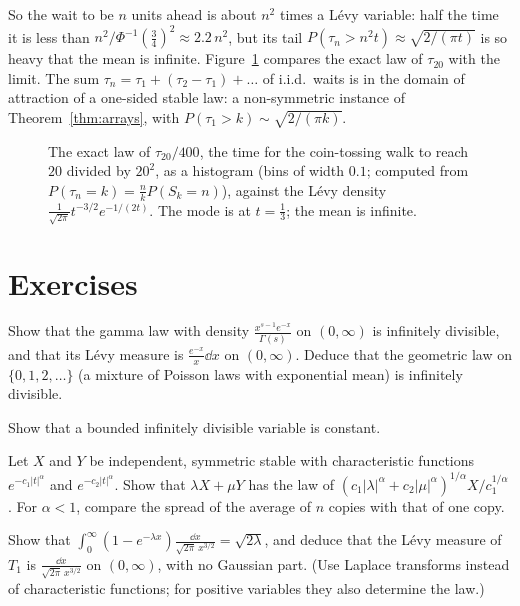 So the wait to be $n$ units ahead is about $n^2$ times a L\'evy variable: half the time it is less than $n^2/\Phi^{-1}(\frac34)^2\approx2.2\,n^2$, but its
tail $P(\tau_n>n^2t)\approx\sqrt{2/(\pi t)}$ is so heavy that the mean is infinite. Figure~\ref{fig:firstpassage} compares the exact law of $\tau_{20}$ with the limit.
The sum $\tau_n=\tau_1+(\tau_2-\tau_1)+\dots$ of i.i.d.\ waits is in the domain of attraction of a one-sided stable law: a non-symmetric instance of
Theorem~\ref{thm:arrays}, with $P(\tau_1>k)\sim\sqrt{2/(\pi k)}$.

\begin{figure}[ht]
\centering{}
\caption{The exact law of $\tau_{20}/400$, the time for the coin-tossing walk to reach $20$ divided by $20^2$, as a histogram (bins of width $0.1$; computed
from $P(\tau_n=k)=\frac nkP(S_k=n)$), against the L\'evy density $\frac1{\sqrt{2\pi}}t^{-3/2}e^{-1/(2t)}$. The mode is at $t=\frac13$; the mean is infinite.}
\label{fig:firstpassage}
\end{figure}

\section{Exercises}

\begin{exercise}[$\star$]\label{ex:idexamples}
Show that the gamma law with density $\frac{x^{s-1}e^{-x}}{\Gamma(s)}$ on $(0,\infty)$ is infinitely divisible, and that its L\'evy measure is $\frac{e^{-x}}x\dd x$ on $(0,\infty)$.
Deduce that the geometric law on $\{0,1,2,\dots\}$ (a mixture of Poisson laws with exponential mean) is infinitely divisible.
\end{exercise}

\begin{exercise}[$\star$]\label{ex:bounded}
Show that a bounded infinitely divisible variable is constant.
\end{exercise}

\begin{exercise}[$\star$]\label{ex:stablesum}
Let $X$ and $Y$ be independent, symmetric stable with characteristic functions $e^{-c_1|t|^\alpha}$ and $e^{-c_2|t|^\alpha}$. Show that $\lambda X+\mu Y$
has the law of $(c_1|\lambda|^\alpha+c_2|\mu|^\alpha)^{1/\alpha}X/c_1^{1/\alpha}$. For $\alpha<1$, compare the spread of the average of $n$ copies with that of one copy.
\end{exercise}

\begin{exercise}[$\star\star$]\label{ex:levymeasure}
Show that $\int_0^\infty(1-e^{-\lambda x})\frac{\dd x}{\sqrt{2\pi}\,x^{3/2}}=\sqrt{2\lambda}$, and deduce that the L\'evy measure of $T_1$ is $\frac{\dd x}{\sqrt{2\pi}\,x^{3/2}}$ on
$(0,\infty)$, with no Gaussian part. (Use Laplace transforms instead of characteristic functions; for positive variables they also determine the law.)
\end{exercise}


